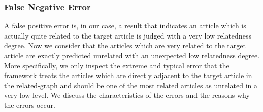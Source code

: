 \subsubsection{False Negative Error}

A false positive error is, in our case, a result that indicates an article which is actually quite related to the target article is judged with a very low relatedness degree. Now we consider that the articles which are very related to the target article are exactly predicted unrelated with an unexpected low relatedness degree. More specifically, we only inspect the extreme and typical error that the framework treats the articles which are directly adjacent to the target article in the related-graph and should be one of the most related articles as unrelated in a very low level. We discuss the characteristics of the errors and the reasons why the errors occur. 

